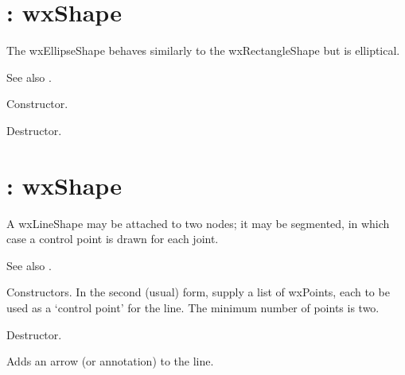 \section{: wxShape}\label{wxellipseshape}

The wxEllipseShape behaves similarly to the wxRectangleShape but is
elliptical.

See also .



Constructor.



Destructor.

\section{: wxShape}\label{wxlineshape}

A wxLineShape may be attached to two nodes; it may be segmented, in which
case a control point is drawn for each joint.

See also .




Constructors. In the second (usual) form, supply a list of wxPoints, each to be used
as a `control point' for the line. The minimum number of points is two.



Destructor.



Adds an arrow (or annotation) to the line.

